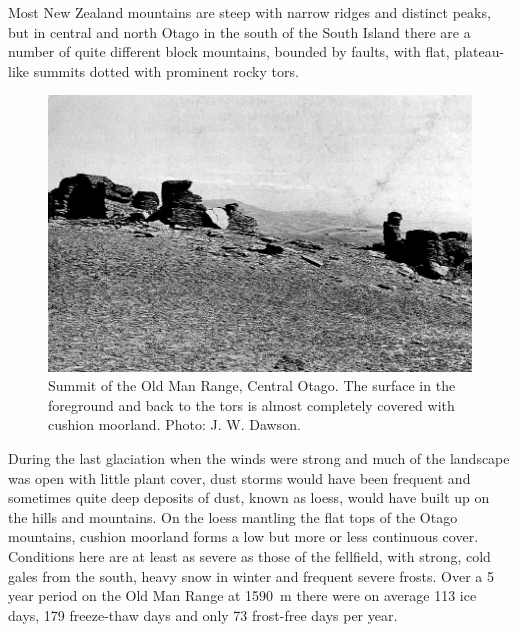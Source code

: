 Most New Zealand mountains are steep with narrow ridges and distinct peaks, but in central and north Otago in the south of the South Island there are a number of quite different block mountains, bounded by faults, with flat, plateau-like summits dotted with prominent rocky tors.
\begin{figure}[!b]
	\includegraphics[width=\textwidth]{graphics/figure113summit.jpg}
	\centering
	\caption[Summit of the Old Man Range]{Summit of the Old Man Range, Central Otago.
	The surface in the foreground and back to the tors is almost completely covered with cushion moorland.
	Photo: J. W. Dawson.}%
	\label{fig:113summit}
\end{figure}
During the last glaciation when the winds were strong and much of the landscape was open with little plant cover, dust storms would have been frequent and sometimes quite deep deposits of dust, known as loess, would have built up on the hills and mountains.
On the loess mantling the flat tops of the Otago mountains, cushion moorland forms a low but more or less continuous cover.
Conditions here are at least as severe as those of the fellfield, with strong, cold gales from the south, heavy snow in winter and frequent severe frosts.
Over a 5 year period on the Old Man Range at \SI{1590}{\metre} there were on average 113 ice days, 179 freeze-thaw days and only 73 frost-free days per year.

